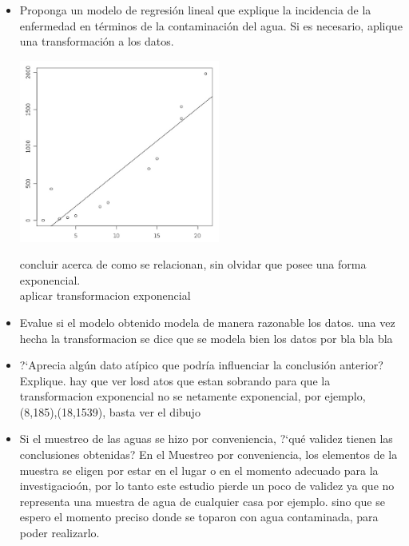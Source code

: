 \begin{itemize}
	\item Proponga un modelo de regresi\'on lineal que explique la incidencia de la enfermedad en
	 t\'erminos de la contaminaci\'on del agua. Si es necesario, aplique una transformaci\'on a los
	 datos.
	\begin{center}
		\includegraphics[height=6cm]{images/preg3}
	\end{center}
	concluir acerca de como se relacionan, sin olvidar que posee una forma exponencial.\\
	aplicar transformacion exponencial
  	\item Evalue si el modelo obtenido modela de manera razonable los datos.
	una vez hecha la transformacion se dice que se modela bien los datos por bla bla bla
	\item ?`Aprecia alg\'un dato at\'ipico que podr\'ia influenciar la conclusi\'on anterior? Explique.
	hay que ver losd atos que estan sobrando para que la transformacion exponencial no se netamente
	exponencial, por ejemplo, (8,185),(18,1539), basta ver el dibujo 
	\item Si el muestreo de las aguas se hizo por conveniencia, ?`qu\'e validez tienen las
	conclusiones obtenidas?
	En el Muestreo por conveniencia, los elementos de la muestra se eligen por estar en el  lugar o en
	el momento adecuado para la investigacio\'on, por lo tanto este estudio pierde un poco de validez
	ya que no representa una muestra de agua de cualquier casa por ejemplo. sino que se espero el momento
	preciso donde se toparon con agua contaminada, para poder realizarlo.

\end{itemize}

